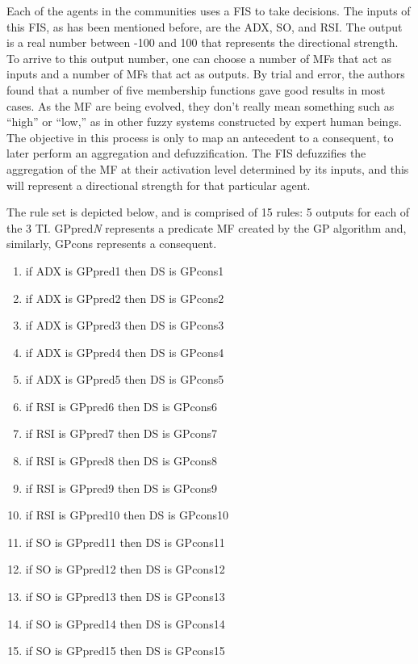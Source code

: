 \documentclass[a4paper,twoside]{article}
\begin{document}
Each of the agents in the communities uses a FIS to take
decisions. The inputs of this FIS, as has been mentioned before, are
the ADX, SO, and RSI. The output is a real number between -100 and 100
that represents the directional strength. To arrive to this output
number, one can choose a number of MFs that act as inputs and a number
of MFs that act as outputs. By trial and error, the authors found that
a number of five membership functions gave good results in most cases. %
%
As the MF are being evolved, they don't really mean something such as
``high'' or ``low,'' as in other fuzzy systems constructed by expert
human beings. The objective in this process is only to map an
antecedent to a consequent, to later perform an aggregation and
defuzzification. %
The FIS
defuzzifies the aggregation of the MF at their activation level
determined by its inputs, and this will represent a directional
strength for that particular agent. 

The rule set is depicted below, and is comprised of 15 rules: 5
outputs for each of the 3 TI. GPpred\textit{N} represents a predicate
MF created by the GP algorithm and, similarly, GPcons
represents a consequent. 

\begin{enumerate}
\item if ADX is GPpred1 then DS is GPcons1
\item if ADX is GPpred2 then DS is GPcons2
\item if ADX is GPpred3 then DS is GPcons3
\item if ADX is GPpred4 then DS is GPcons4
\item if ADX is GPpred5 then DS is GPcons5

\item if RSI is GPpred6 then DS is GPcons6
\item if RSI is GPpred7 then DS is GPcons7
\item if RSI is GPpred8 then DS is GPcons8
\item if RSI is GPpred9 then DS is GPcons9
\item if RSI is GPpred10 then DS is GPcons10

\item if SO is GPpred11 then DS is GPcons11
\item if SO is GPpred12 then DS is GPcons12
\item if SO is GPpred13 then DS is GPcons13
\item if SO is GPpred14 then DS is GPcons14
\item if SO is GPpred15 then DS is GPcons15
\end{enumerate}
\end{document}
